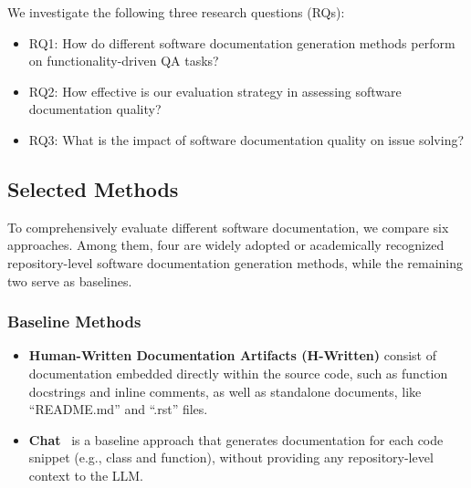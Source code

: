 We investigate the following three research questions (RQs):

\begin{itemize}[leftmargin=*]
    \item RQ1: How do different software documentation generation methods perform on functionality-driven QA tasks? 
    \item RQ2: How effective is our evaluation strategy in assessing software documentation quality? 
    \item RQ3: What is the impact of software documentation quality on issue solving?
\end{itemize}

\subsection{Selected Methods}
To comprehensively evaluate different software documentation, we compare six approaches. Among them, four are widely adopted or academically recognized repository-level software documentation generation methods, while the remaining two serve as baselines.

\subsubsection{Baseline Methods}
\begin{itemize}[leftmargin=*]
    \item \textbf{Human-Written Documentation Artifacts (H-Written)} consist of documentation embedded directly within the source code, such as function docstrings and inline comments, as well as standalone documents, like ``README.md'' and ``.rst'' files.
    \item \textbf{Chat}~\cite{docagent} is a baseline approach that generates documentation for each code snippet (e.g., class and function), without providing any repository-level context to the LLM.
\end{itemize}

